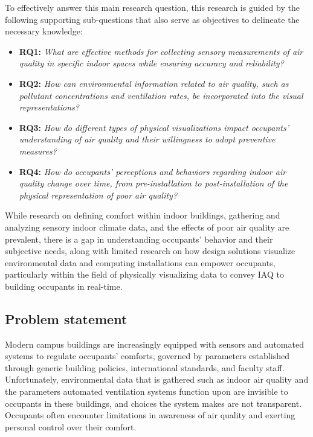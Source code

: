 To effectively answer this main research question, this research is guided by the following supporting sub-questions that also serve as objectives to delineate the necessary knowledge:

\begin{itemize}
    \item \textbf{RQ1:} \emph{What are effective methods for collecting sensory measurements of air quality in specific indoor spaces while ensuring accuracy and reliability?}
    \item \textbf{RQ2:} \emph{How can environmental information related to air quality, such as pollutant concentrations and ventilation rates, be incorporated into the visual representations?}
    \item \textbf{RQ3:} \emph{How do different types of physical visualizations impact occupants' understanding of air quality and their willingness to adopt preventive measures?}
    \item \textbf{RQ4:} \emph{How do occupants' perceptions and behaviors regarding indoor air quality change over time, from pre-installation to post-installation of the physical representation of poor air quality?}\\
\end{itemize}


While research on defining comfort within indoor buildings, gathering and analyzing sensory indoor climate data, and the effects of poor air quality are prevalent, there is a gap in understanding occupants' behavior and their subjective needs, along with limited research on how design solutions visualize environmental data and computing installations can empower occupants, particularly within the field of physically visualizing data to convey IAQ to building occupants in real-time.

\subsection{Problem statement}

Modern campus buildings are increasingly equipped with sensors and automated systems to regulate occupants' comforts, governed by parameters established through generic building policies, international standards, and faculty staff. Unfortunately, environmental data that is gathered such as indoor air quality and the parameters automated ventilation systems function upon are invisible to occupants in these buildings, and choices the system makes are not transparent. Occupants often encounter limitations in awareness of air quality and exerting personal control over their comfort.

